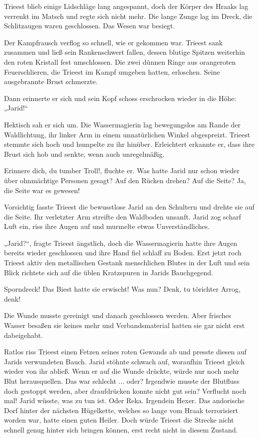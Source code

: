 Trieest blieb einige Lidschläge lang angespannt, doch der Körper des Hraaks lag verrenkt im Matsch und regte sich nicht mehr. Die lange Zunge lag im Dreck, die Schlitzaugen waren geschlossen. Das Wesen war besiegt.

Der Kampfrausch verflog so schnell, wie er gekommen war. Trieest sank zusammen und ließ sein Rankenschwert fallen, dessen blutige Spitzen weiterhin den roten Kristall fest umschlossen. Die zwei dünnen Ringe aus orangeroten Feuerschlieren, die Trieest im Kampf umgeben hatten, erloschen. Seine ausgebrannte Brust schmerzte.

Dann erinnerte er sich und sein Kopf schoss erschrocken wieder in die Höhe: „Jarid!“

Hektisch sah er sich um. Die Wassermagierin lag bewegungslos am Rande der Waldlichtung, ihr linker Arm in einem unnatürlichen Winkel abgespreizt. Trieest stemmte sich hoch und humpelte zu ihr hinüber. Erleichtert erkannte er, dass ihre Brust sich hob und senkte, wenn auch unregelmäßig.

Erinnere dich, du tumber Troll!, fluchte er. Was hatte Jarid nur schon wieder über ohnmächtige Personen gesagt? Auf den Rücken drehen? Auf die Seite? Ja, die Seite war es gewesen!

Vorsichtig fasste Trieest die bewusstlose Jarid an den Schultern und drehte sie auf die Seite. Ihr verletzter Arm streifte den Waldboden unsanft. Jarid zog scharf Luft ein, riss ihre Augen auf und murmelte etwas Unverständliches.

„Jarid?“, fragte Trieest ängstlich, doch die Wassermagierin hatte ihre Augen bereits wieder geschlossen und ihre Hand fiel schlaff zu Boden. Erst jetzt roch Trieest aktiv den metallischen Gestank menschlichen Blutes in der Luft und sein Blick richtete sich auf die üblen Kratzspuren in Jarids Bauchgegend.

Sporndreck! Das Biest hatte sie erwischt! Was nun? Denk, tu törichter Arrog, denk!

Die Wunde musste gereinigt und danach geschlossen werden. Aber frisches Wasser besaßen sie keines mehr und Verbandsmaterial hatten sie gar nicht erst dabeigehabt.

Ratlos riss Trieest einen Fetzen seines roten Gewands ab und presste diesen auf Jarids verwundeten Bauch. Jarid stöhnte schwach auf, woraufhin Trieest gleich wieder von ihr abließ. Wenn er auf die Wunde drückte, würde nur noch mehr Blut herausquellen. Das war schlecht ... oder? Irgendwie musste der Blutfluss doch gestoppt werden, aber draufdrücken konnte nicht gut sein? Verflucht noch mal! Jarid wüsste, was zu tun ist. Oder Reka. Irgendein Hexer. Das andorische Dorf hinter der nächsten Hügelkette, welches so lange vom Hraak terrorisiert worden war, hatte einen guten Heiler. Doch würde Trieest die Strecke nicht schnell genug hinter sich bringen können, erst recht nicht in diesem Zustand.

